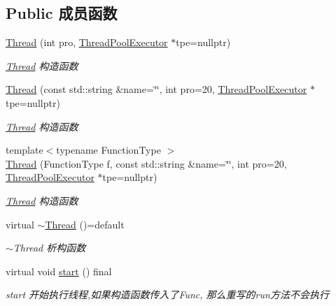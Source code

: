 \subsection*{Public 成员函数}
\begin{DoxyCompactItemize}
\item 
\hyperlink{classThread_a2375aeb8a227668652d593b180bac64e}{Thread} (int pro, \hyperlink{classThreadPoolExecutor}{Thread\+Pool\+Executor} $\ast$tpe=nullptr)
\begin{DoxyCompactList}\small\item\em \hyperlink{classThread}{Thread} 构造函数 \end{DoxyCompactList}\item 
\hyperlink{classThread_aa32c32f43d92d235c9e795bea80e9058}{Thread} (const std\+::string \&name=\char`\"{}\char`\"{}, int pro=20, \hyperlink{classThreadPoolExecutor}{Thread\+Pool\+Executor} $\ast$tpe=nullptr)
\begin{DoxyCompactList}\small\item\em \hyperlink{classThread}{Thread} 构造函数 \end{DoxyCompactList}\item 
{\footnotesize template$<$typename Function\+Type $>$ }\\\hyperlink{classThread_a67eed36a7c4cb621651a6ce40939cf44}{Thread} (Function\+Type f, const std\+::string \&name=\char`\"{}\char`\"{}, int pro=20, \hyperlink{classThreadPoolExecutor}{Thread\+Pool\+Executor} $\ast$tpe=nullptr)
\begin{DoxyCompactList}\small\item\em \hyperlink{classThread}{Thread} 构造函数 \end{DoxyCompactList}\item 
\mbox{\label{classThread_a957c601b090d6c2798c3cceb4ae5dc0f}} 
virtual \hyperlink{classThread_a957c601b090d6c2798c3cceb4ae5dc0f}{$\sim$\+Thread} ()=default
\begin{DoxyCompactList}\small\item\em $\sim$\+Thread 析构函数 \end{DoxyCompactList}\item 
\mbox{\label{classThread_a3a36451e02a15180624cdd88212cb1ba}} 
virtual void \hyperlink{classThread_a3a36451e02a15180624cdd88212cb1ba}{start} () final
\begin{DoxyCompactList}\small\item\em start 开始执行线程,如果构造函数传入了\+Func, 那么重写的run方法不会执行 \end{DoxyCompactList}\item 

\end{DoxyCompactItemize}
